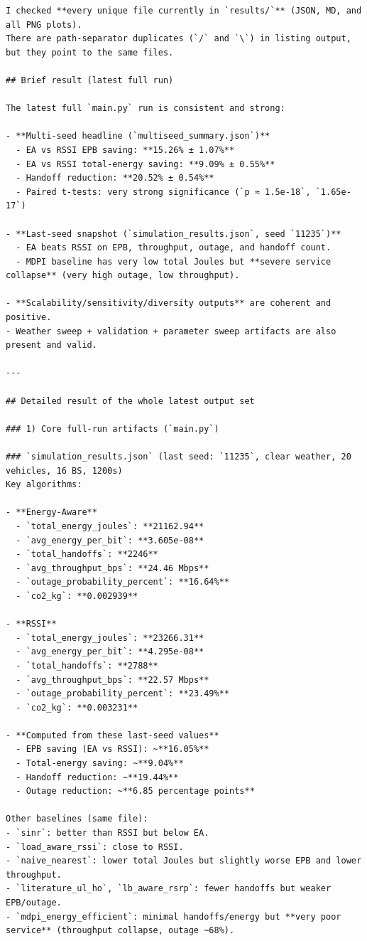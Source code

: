 \documentclass[11pt,a4paper]{article}
\newenvironment{assistantbox}
  {\begin{tcolorbox}[
    breakable,
    colback=AsstBG,
    colframe=AsstBorder,
    title=Project Overview Extract,
    fonttitle=\bfseries\small\color{white},
    coltitle=white,
    colbacktitle=AsstBorder,
    boxrule=0.5pt,
    arc=1.2mm,
    left=1.4mm,right=1.4mm,top=0.8mm,bottom=0.8mm,
    boxsep=0.6mm,
    before skip=0pt,
    after skip=0pt
  ]}
  {\end{tcolorbox}}
\begin{document}
\begin{assistantbox}
\begin{Verbatim}[breaklines=true,breakanywhere=true]
I checked **every unique file currently in `results/`** (JSON, MD, and all PNG plots).  
There are path-separator duplicates (`/` and `\`) in listing output, but they point to the same files.

## Brief result (latest full run)

The latest full `main.py` run is consistent and strong:

- **Multi-seed headline (`multiseed_summary.json`)**
  - EA vs RSSI EPB saving: **15.26% ± 1.07%**
  - EA vs RSSI total-energy saving: **9.09% ± 0.55%**
  - Handoff reduction: **20.52% ± 0.54%**
  - Paired t-tests: very strong significance (`p ≈ 1.5e-18`, `1.65e-17`)

- **Last-seed snapshot (`simulation_results.json`, seed `11235`)**
  - EA beats RSSI on EPB, throughput, outage, and handoff count.
  - MDPI baseline has very low total Joules but **severe service collapse** (very high outage, low throughput).

- **Scalability/sensitivity/diversity outputs** are coherent and positive.
- Weather sweep + validation + parameter sweep artifacts are also present and valid.

---

## Detailed result of the whole latest output set

### 1) Core full-run artifacts (`main.py`)

### `simulation_results.json` (last seed: `11235`, clear weather, 20 vehicles, 16 BS, 1200s)
Key algorithms:

- **Energy-Aware**
  - `total_energy_joules`: **21162.94**
  - `avg_energy_per_bit`: **3.605e-08**
  - `total_handoffs`: **2246**
  - `avg_throughput_bps`: **24.46 Mbps**
  - `outage_probability_percent`: **16.64%**
  - `co2_kg`: **0.002939**

- **RSSI**
  - `total_energy_joules`: **23266.31**
  - `avg_energy_per_bit`: **4.295e-08**
  - `total_handoffs`: **2788**
  - `avg_throughput_bps`: **22.57 Mbps**
  - `outage_probability_percent`: **23.49%**
  - `co2_kg`: **0.003231**

- **Computed from these last-seed values**
  - EPB saving (EA vs RSSI): ~**16.05%**
  - Total-energy saving: ~**9.04%**
  - Handoff reduction: ~**19.44%**
  - Outage reduction: ~**6.85 percentage points**

Other baselines (same file):
- `sinr`: better than RSSI but below EA.
- `load_aware_rssi`: close to RSSI.
- `naive_nearest`: lower total Joules but slightly worse EPB and lower throughput.
- `literature_ul_ho`, `lb_aware_rsrp`: fewer handoffs but weaker EPB/outage.
- `mdpi_energy_efficient`: minimal handoffs/energy but **very poor service** (throughput collapse, outage ~68%).


\end{Verbatim}
\end{assistantbox}
\end{document}
